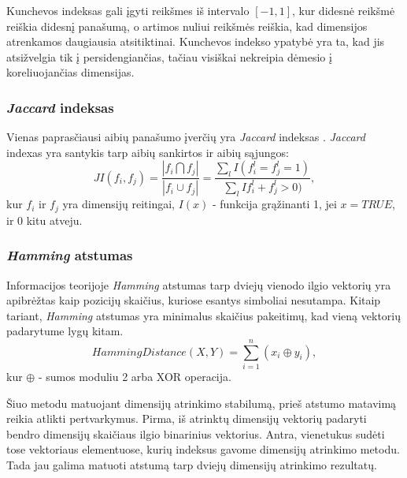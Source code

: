 Kunchevos indeksas gali įgyti reikšmes iš intervalo $[-1, 1]$, kur didesnė reikšmė reiškia didesnį panašumą, o artimos nuliui reikšmės reiškia, kad dimensijos atrenkamos daugiausia atsitiktinai. Kunchevos indekso ypatybė yra ta, kad jis atsižvelgia tik į persidengiančias, tačiau visiškai nekreipia dėmesio į koreliuojančias dimensijas.

\subsubsection{\textit{Jaccard} indeksas}

Vienas paprasčiausi aibių panašumo įverčių yra \textit{Jaccard} indeksas \cite{jaccard1901etude}. \textit{Jaccard} indexas yra santykis tarp aibių sankirtos ir aibių sąjungos:
\begin{equation}
\label{jaccard_index}
 JI(f_i, f_j)=\frac{|f_i \bigcap f_j|}{|f_i \cup f_j|}=\frac{\sum_{l}I(f_i^l=f_j^l=1)}{\sum_{l}I{f_i^l+f_j^l > 0)}}, 
\end{equation}
kur $f_i$ ir $f_j$ yra dimensijų reitingai, $I(x)$ - funkcija grąžinanti 1, jei $x=TRUE$, ir 0 kitu atveju.

\subsubsection{\textit{Hamming} atstumas}

Informacijos teorijoje \textit{Hamming} atstumas \cite{hamming1950error} tarp dviejų vienodo ilgio vektorių yra apibrėžtas kaip pozicijų skaičius, kuriose esantys simboliai nesutampa. Kitaip tariant, \textit{Hamming} atstumas yra minimalus skaičius pakeitimų, kad vieną vektorių padarytume lygų kitam. 
\begin{equation}
\label{hamming_distance}
 Hamming Distance(X, Y)= \sum_{i=1}^{n} (x_i \oplus y_i),
\end{equation}
kur $\oplus$ - sumos moduliu 2 arba XOR operacija.

Šiuo metodu matuojant dimensijų atrinkimo stabilumą, prieš atstumo matavimą reikia atlikti pertvarkymus. Pirma, iš atrinktų dimensijų vektorių padaryti bendro dimensijų skaičiaus ilgio binarinius vektorius. Antra, vienetukus sudėti tose vektoriaus elementuose, kurių indeksus gavome dimensijų atrinkimo metodu. Tada jau galima matuoti atstumą tarp dviejų dimensijų atrinkimo rezultatų.
